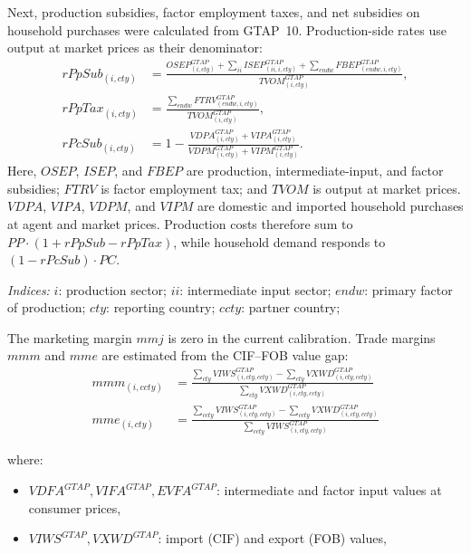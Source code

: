 \bigskip

Next, production subsidies, factor employment taxes, and net subsidies on household purchases were calculated from GTAP~10. Production-side rates use output at market prices as their denominator:
\begin{align}
rPpSub_{(i,cty)}
&= \frac{OSEP^{GTAP}_{(i,cty)}+\sum_{ii}ISEP^{GTAP}_{(ii,i,cty)}
+\sum_{endw}FBEP^{GTAP}_{(endw,i,cty)}}{TVOM^{GTAP}_{(i,cty)}},\\
rPpTax_{(i,cty)}
&= \frac{\sum_{endw}FTRV^{GTAP}_{(endw,i,cty)}}{TVOM^{GTAP}_{(i,cty)}},\\
rPcSub_{(i,cty)}
&=1-\frac{VDPA^{GTAP}_{(i,cty)}+VIPA^{GTAP}_{(i,cty)}}
{VDPM^{GTAP}_{(i,cty)}+VIPM^{GTAP}_{(i,cty)}}.
\end{align}
Here, \(OSEP\), \(ISEP\), and \(FBEP\) are production, intermediate-input, and factor subsidies; \(FTRV\) is factor employment tax; and \(TVOM\) is output at market prices. \(VDPA\), \(VIPA\), \(VDPM\), and \(VIPM\) are domestic and imported household purchases at agent and market prices. Production costs therefore sum to \(PP\cdot(1+rPpSub-rPpTax)\), while household demand responds to \((1-rPcSub)\cdot PC\).

\textit{Indices:}  
\( i \): production sector;  
\( ii \): intermediate input sector;  
\( endw \): primary factor of production;  
\( cty \): reporting country;  
\( ccty \): partner country;  

\bigskip

The marketing margin \(mmj\) is zero in the current calibration. Trade margins \(mmm\) and \(mme\) are estimated from the CIF--FOB value gap:
\begin{align}
mmm_{(i,ccty)}
&=
\frac{
  \sum_{cty} VIWS^{GTAP}_{(i,cty,ccty)}
  - \sum_{cty} VXWD^{GTAP}_{(i,cty,ccty)}
}{
  \sum_{cty} VXWD^{GTAP}_{(i,cty,ccty)}
}
\\[0.5em]
mme_{(i,cty)}
&=
\frac{
  \sum_{ccty} VIWS^{GTAP}_{(i,cty,ccty)}
  - \sum_{ccty} VXWD^{GTAP}_{(i,cty,ccty)}
}{
  \sum_{ccty} VIWS^{GTAP}_{(i,cty,ccty)}
}
\end{align}


where:
\begin{itemize}
\item \( VDFA^{GTAP}, VIFA^{GTAP}, EVFA^{GTAP} \): intermediate and factor input values at consumer prices,  
\item \( VIWS^{GTAP}, VXWD^{GTAP} \): import (CIF) and export (FOB) values,  
\end{itemize}


